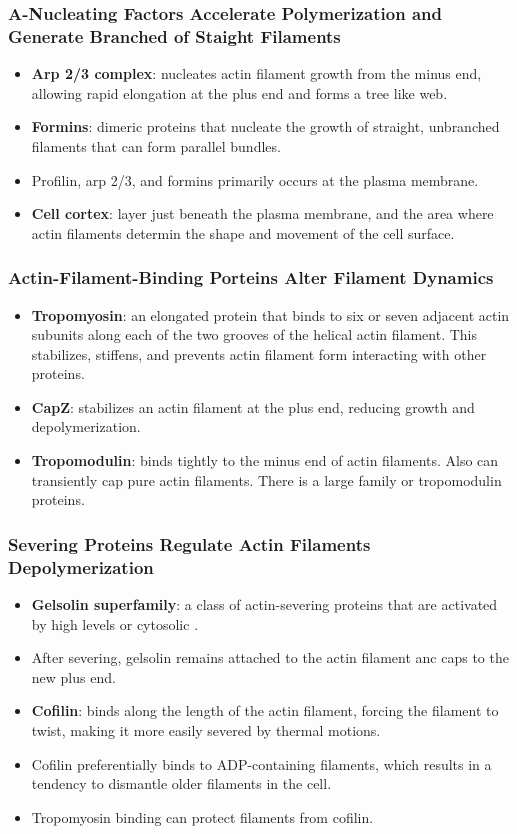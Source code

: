 \documentclass[12pt,a4paper]{article}
\begin{document}
\subsubsection{A-Nucleating Factors Accelerate Polymerization and Generate Branched of Staight Filaments}
\begin{itemize}
    \item \textbf{Arp 2/3 complex}: nucleates actin filament growth from the minus end, allowing rapid elongation at the plus end and forms a tree like web.
    \item \textbf{Formins}: dimeric proteins that nucleate the growth of straight, unbranched filaments that can form parallel bundles.
    \item Profilin, arp 2/3, and formins primarily occurs at the plasma membrane. 
    \item \textbf{Cell cortex}: layer just beneath the plasma membrane, and the area where actin filaments determin the shape and movement of the cell surface.
\end{itemize}

\subsubsection{Actin-Filament-Binding Porteins Alter Filament Dynamics}
\begin{itemize}
    \item \textbf{Tropomyosin}: an elongated protein that binds to six or seven adjacent actin subunits along each of the two grooves of the helical actin filament. This stabilizes, stiffens, and prevents actin filament form interacting with other proteins.
    \item \textbf{CapZ}: stabilizes an actin filament at the plus end, reducing growth and depolymerization. 
    \item \textbf{Tropomodulin}: binds tightly to the minus end of actin filaments. Also can transiently cap pure actin filaments. There is a large family or tropomodulin proteins.
\end{itemize}

\subsubsection{Severing Proteins Regulate Actin Filaments Depolymerization}
\begin{itemize}
    \item \textbf{Gelsolin superfamily}: a class of actin-severing proteins that are activated by high levels or cytosolic .
    \item After severing, gelsolin remains attached to the actin filament anc caps to the new plus end.
    \item \textbf{Cofilin}: binds along the length of the actin filament, forcing the filament to twist, making it more easily severed by thermal motions.
    \item Cofilin preferentially binds to ADP-containing filaments, which results in a tendency to dismantle older filaments in the cell.
    \item Tropomyosin binding can protect filaments from cofilin.
\end{itemize}
\end{document}
